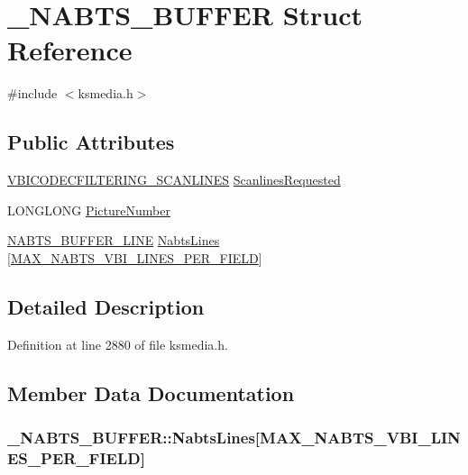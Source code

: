 \hypertarget{struct___n_a_b_t_s___b_u_f_f_e_r}{}\section{\+\_\+\+N\+A\+B\+T\+S\+\_\+\+B\+U\+F\+F\+ER Struct Reference}
\label{struct___n_a_b_t_s___b_u_f_f_e_r}


{\ttfamily \#include $<$ksmedia.\+h$>$}

\subsection*{Public Attributes}
\begin{DoxyCompactItemize}
\item 
\hyperlink{ksmedia_8h_adc03ca4cc884d2dd2dcec672584d8a42}{V\+B\+I\+C\+O\+D\+E\+C\+F\+I\+L\+T\+E\+R\+I\+N\+G\+\_\+\+S\+C\+A\+N\+L\+I\+N\+ES} \hyperlink{struct___n_a_b_t_s___b_u_f_f_e_r_a3810c7b645f084ec55572181bd6ccfc5}{Scanlines\+Requested}
\item 
L\+O\+N\+G\+L\+O\+NG \hyperlink{struct___n_a_b_t_s___b_u_f_f_e_r_af670fb0f9e364e8120b31c543d2ffbc6}{Picture\+Number}
\item 
\hyperlink{ksmedia_8h_a96ab2cf424e7ce8524aac70a81d8a84a}{N\+A\+B\+T\+S\+\_\+\+B\+U\+F\+F\+E\+R\+\_\+\+L\+I\+NE} \hyperlink{struct___n_a_b_t_s___b_u_f_f_e_r_ada0267a5d3de1d775e792fb977e2da49}{Nabts\+Lines} \mbox{[}\hyperlink{ksmedia_8h_a380c28e8d0962e9bbe056c2dbcebe0eb}{M\+A\+X\+\_\+\+N\+A\+B\+T\+S\+\_\+\+V\+B\+I\+\_\+\+L\+I\+N\+E\+S\+\_\+\+P\+E\+R\+\_\+\+F\+I\+E\+LD}\mbox{]}
\end{DoxyCompactItemize}


\subsection{Detailed Description}


Definition at line 2880 of file ksmedia.\+h.



\subsection{Member Data Documentation}
\subsubsection[{\texorpdfstring{Nabts\+Lines}{NabtsLines}}]{ \+\_\+\+N\+A\+B\+T\+S\+\_\+\+B\+U\+F\+F\+E\+R\+::\+Nabts\+Lines\mbox{[}{\bf M\+A\+X\+\_\+\+N\+A\+B\+T\+S\+\_\+\+V\+B\+I\+\_\+\+L\+I\+N\+E\+S\+\_\+\+P\+E\+R\+\_\+\+F\+I\+E\+LD}\mbox{]}}\hypertarget{struct___n_a_b_t_s___b_u_f_f_e_r_ada0267a5d3de1d775e792fb977e2da49}{}\label{struct___n_a_b_t_s___b_u_f_f_e_r_ada0267a5d3de1d775e792fb977e2da49}


